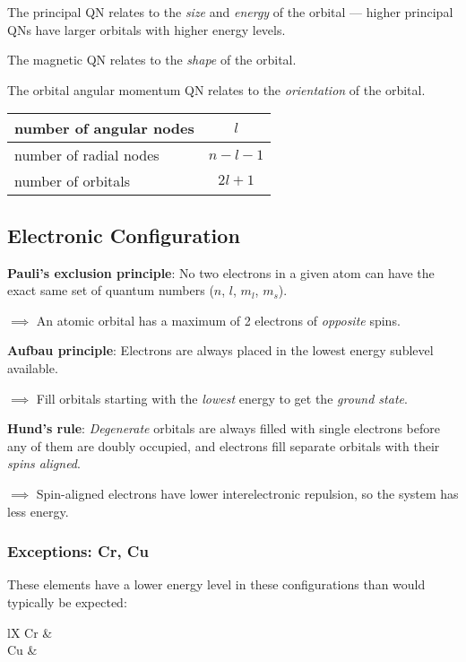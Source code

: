 The principal QN relates to the \textit{size} and \textit{energy} of the orbital --- higher principal QNs
have larger orbitals with higher energy levels.

The magnetic QN relates to the \textit{shape} of the orbital.

The orbital angular momentum QN relates to the \textit{orientation} of the orbital.

\begin{tabularx}{\linewidth}{|Y|c|} \hline
    number of angular nodes & $l$ \\ \hline
    number of radial nodes & $n - l - 1$ \\ \hline
    number of orbitals & $2l + 1$ \\ \hline
\end{tabularx}

\subsection{Electronic Configuration}
\textbf{Pauli's exclusion principle}: No two electrons in a given atom can have the exact
same set of quantum numbers ($n$, $l$, $m_l$, $m_s$).

$\implies$ An atomic orbital has a maximum of 2 electrons of \textit{opposite} spins.

\textbf{Aufbau principle}: Electrons are always placed in the lowest energy sublevel available.

$\implies$ Fill orbitals starting with the \textit{lowest} energy to get the \textit{ground state}.

\textbf{Hund's rule}: \textit{Degenerate} orbitals are always filled with single electrons before any of them
are doubly occupied, and electrons fill separate orbitals with their \textit{spins aligned}.

$\implies$ Spin-aligned electrons have lower interelectronic repulsion, so the system has less energy.

\subsubsection{Exceptions: Cr, Cu}
These elements have a lower energy level in these configurations than would typically be expected:

\begin{tblr}{lX}
    Cr & \quad {} \\
    Cu & \quad {} \\
\end{tblr}

